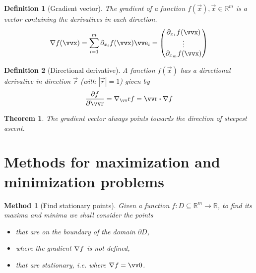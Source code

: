 \documentclass[twocolumn, margin=normal]{tex/hsrzf}
\theoremstyle{fuvarzf}
\newtheorem{theorem}{Theorem}
\newtheorem{method}{Method}
\newtheorem{definition}{Definition}
\begin{document}
\begin{definition}[Gradient vector]
  The \emph{gradient} of a function \(f(\vec{x}), \vec{x}\in\mathbb{R}^m\) is a
  vector containing the derivatives in each direction.
  \[
    \grad f (\vec{x}) = \sum_{i=1}^m \partial_{x_i} f(\vec{x}) \vec{e}_i
      = \begin{pmatrix}
        \partial_{x_1} f(\vec{x}) \\
        \vdots \\
        \partial_{x_m} f(\vec{x}) \\
      \end{pmatrix}
  \]
\end{definition}

\begin{definition}[Directional derivative]
  A function \(f(\vec{x})\) has a directional derivative in direction
  \(\vec{r}\) (with \(|\vec{r}| = 1\)) given by
  \[
    \frac{\partial f}{\partial\vec{r}} 
      = \nabla_\vec{r} f = \vec{r} \dotp \grad f
  \]
\end{definition}

\begin{theorem}
  The gradient vector always points towards \emph{the direction of steepest
  ascent}.
\end{theorem}

\section{Methods for maximization and minimization problems}

\begin{method}[Find stationary points]
  Given a function \(f: D \subseteq \mathbb{R}^m \to \mathbb{R}\), to
  find its maxima and minima we shall consider the points
  \begin{itemize}
    \item that are on the boundary of the domain \(\partial D\),
    \item where the gradient \(\nabla f\) is not defined,
    \item that are stationary, i.e. where \(\grad f = \vec{0}\).
  \end{itemize}
\end{method}
\end{document}
